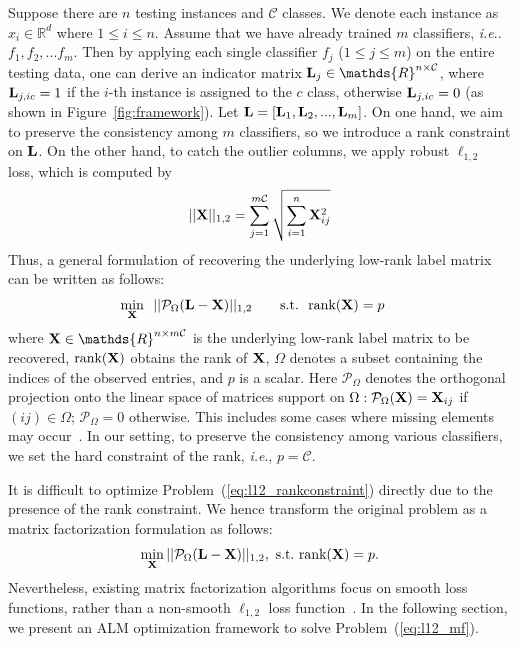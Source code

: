 \documentclass[letterpaper]{article} %
\def\calP{\mathcal{P}}
\def\calC{{\mathcal{C}}}
\def\bL{{\bf L}}
\def\dsR{\mathds{R}}
\def\bX{{\bf X}}
\def\bX{{\bf X}}
\def\st{{\text{s.t.}}}
\def\ie{\emph{ie}}
\def\rank{{\text{rank}}}
\def\ie{\emph{i.e}.} \def\Ie{\emph{I.e}.}
\begin{document}
Suppose there are $n$ testing instances and $\calC$ classes.
We denote each instance as $x_i \in \dsR^{d}$ where $1 \leq i \leq n$.
Assume that we have already trained $m$ classifiers, \ie. $f_1, f_2, ... f_m$.
Then by applying each single classifier $f_j$ ($1 \leq j \leq m$) on the entire testing data, one can derive an indicator matrix $\bL_j \in \dsR^{n \times \calC}$, where $\bL_{j, ic} = 1$ if the $i$-th instance is assigned to the $c$ class, otherwise $\bL_{j, ic} = 0$ (as shown in Figure~\ref{fig:framework}).
Let $\bL = [ \bL_1, \bL_2, ..., \bL_m ]$.
On one hand, we aim to preserve the consistency among $m$ classifiers, so we introduce a rank constraint on $\bL$.
On the other hand, to catch the outlier columns, we apply robust $\ell_{1, 2}$ loss, which is computed by
{\small
\begin{align}
|| \bX ||_{1,2} = \sum_{j = 1}^{m\calC} \sqrt{ \sum_{i = 1}^{n} \bX_{ij}^2 }
\end{align}
}\noindent
Thus, a general formulation of recovering the underlying low-rank label matrix can be written as follows:
{\small
\begin{align}\label{eq:l12_rankconstraint}
  \min_{\bX} ~&~ || \calP_{\Omega} (\bL - \bX) ||_{1,2}~~~~~~\st~~\rank(\bX) = p
\end{align}
}
\noindent
where $\bX \in \dsR^{n \times m\calC}$ is the underlying low-rank label matrix to be recovered, $\rank(\bX)$ obtains the rank of $\bX$,
$\Omega$ denotes a subset containing the indices of the observed entries,
and $p$ is a scalar.
Here $\calP_{\Omega}$ denotes the orthogonal projection onto the linear space of matrices support on $\Omega: \calP_{\Omega}(\bX) = \bX_{ij}$ if $(ij) \in \Omega$; $\calP_{\Omega} = 0$ otherwise.
This includes some cases where missing elements may occur~\cite{vanicassp2014late}.
In our setting, to preserve the consistency among various classifiers, we set the hard constraint of the rank, \ie, $p = \calC$.



It is difficult to optimize Problem~(\ref{eq:l12_rankconstraint}) directly due to the presence of the rank constraint.
We hence transform the original problem as a matrix factorization formulation as follows:
{\small
\begin{align}\label{eq:l12_mf}
  \min_{\bX} || \calP_{\Omega}(\bL - \bX) ||_{1,2} ,~  \st~ \rank(\bX) = p  .
\end{align}
}
\noindent
Nevertheless, existing matrix factorization algorithms focus on smooth loss functions, rather than a non-smooth $\ell_{1,2}$ loss function~\cite{vandereycken2013lowrank,Wen2012,ngonips2012scaled,rtrmc2011boumal}.
In the following section, we present an ALM optimization framework to solve Problem~(\ref{eq:l12_mf}).
\end{document}
